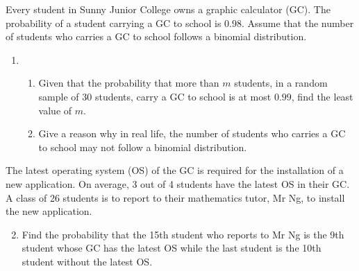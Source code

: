 \begin{problem}
    Every student in Sunny Junior College owns a graphic calculator (GC). The probability of a student carrying a GC to school is $0.98$. Assume that the number of students who carries a GC to school follows a binomial distribution.

    \begin{enumerate}
        \item \begin{enumerate}
            \item Given that the probability that more than $m$ students, in a random sample of 30 students, carry a GC to school is at most $0.99$, find the least value of $m$.
            \item Give a reason why in real life, the number of students who carries a GC to school may not follow a binomial distribution.
        \end{enumerate}
    \end{enumerate}

    The latest operating system (OS) of the GC is required for the installation of a new application. On average, 3 out of 4 students have the latest OS in their GC. A class of 26 students is to report to their mathematics tutor, Mr Ng, to install the new application.

    \begin{enumerate}
        \setcounter{enumi}{1}
        \item Find the probability that the 15th student who reports to Mr Ng is the 9th student whose GC has the latest OS while the last student is the 10th student without the latest OS.
    \end{enumerate}
\end{problem}
